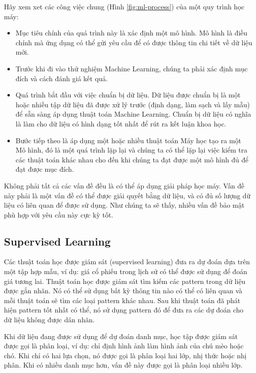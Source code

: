 Hãy xem xet các công việc chung (Hình \ref{fig:ml-process}) của một quy trình học máy:

\begin{itemize}
\item Mục tiêu chính của quá trình này là xác định một mô hình. 
Mô hình là điều chính mà ứng dụng có thể gửi yêu cầu để có được thông tin chi tiết về dữ liệu mới.
\item Trước khi đi vào thử nghiệm Machine Learning, chúng ta phải xác định mục đích và cách đánh giá kết quả.
\item Quá trình bắt đầu với việc chuẩn bị dữ liệu. 
Dữ liệu được chuẩn bị là một hoặc nhiều tập dữ liệu đã được xử lý trước (định dạng, làm sạch và lấy mẫu) để sẵn sàng áp dụng thuật toán Machine Learning. 
Chuẩn bị dữ liệu có nghĩa là làm cho dữ liệu có hình dạng tốt nhất để rút ra kết luận khoa học.
\item Bước tiếp theo là áp dụng một hoặc nhiều thuật toán Máy học tạo ra một Mô hình, đó là một quá trình lặp lại và chúng ta có thể lặp lại việc kiểm tra các thuật toán khác nhau cho đến khi chúng ta đạt được một mô hình đủ để đạt được mục đích.
\end{itemize}

Không phải tất cả các vấn đề đều là có thể áp dụng giải pháp học máy. 
Vấn đề này phải là một vấn đề có thể được giải quyết bằng dữ liệu, và có đủ số lượng dữ liệu có liên quan để được sử dụng. 
Như chúng ta sẽ thấy, nhiều vấn đề bảo mật phù hợp với yêu cầu này cực kỳ tốt.

\subsection{Supervised Learning}
\label{ssec:supervised-learning}

Các thuật toán học được giám sát (supervised learning) đưa ra dự đoán dựa trên một tập hợp mẫu, ví dụ: giá cổ phiếu trong lịch sử có thể được sử dụng để đoán giá tương lai.
Thuật toán học được giám sát tìm kiếm các pattern trong dữ liệu được gắn nhãn.
Nó có thể sử dụng bất kỳ thông tin nào có thể có liên quan và mỗi thuật toán sẽ tìm các loại pattern khác nhau.
Sau khi thuật toán đã phát hiện pattern tốt nhất có thể, nó sử dụng pattern đó để đưa ra các dự đoán cho dữ liệu không được dán nhãn.

Khi dữ liệu đang được sử dụng để dự đoán danh mục, học tập được giám sát được gọi là phân loại, ví dụ: chỉ định hình ảnh làm hình ảnh của chú mèo hoặc chó. Khi chỉ có hai lựa chọn, nó được gọi là phân loại hai lớp, nhị thức hoặc nhị phân. Khi có nhiều danh mục hơn, vấn đề này được gọi là phân loại nhiều lớp.

